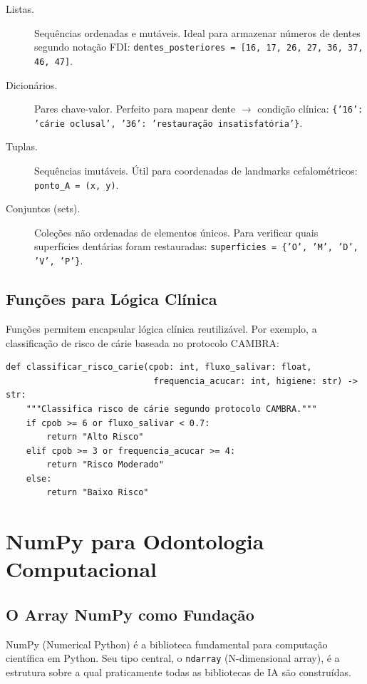 \begin{description}
    \item[Listas.] Sequências ordenadas e mutáveis. Ideal para armazenar números de dentes segundo notação FDI: \texttt{dentes\_posteriores = [16, 17, 26, 27, 36, 37, 46, 47]}.
    \item[Dicionários.] Pares chave-valor. Perfeito para mapear dente $\rightarrow$ condição clínica: \texttt{\{'16': 'cárie oclusal', '36': 'restauração insatisfatória'\}}.
    \item[Tuplas.] Sequências imutáveis. Útil para coordenadas de landmarks cefalométricos: \texttt{ponto\_A = (x, y)}.
    \item[Conjuntos (sets).] Coleções não ordenadas de elementos únicos. Para verificar quais superfícies dentárias foram restauradas: \texttt{superficies = \{'O', 'M', 'D', 'V', 'P'\}}.
\end{description}

\subsection{Funções para Lógica Clínica}

Funções permitem encapsular lógica clínica reutilizável. Por exemplo, a classificação de risco de cárie baseada no protocolo CAMBRA:

\begin{verbatim}
def classificar_risco_carie(cpob: int, fluxo_salivar: float,
                             frequencia_acucar: int, higiene: str) -> str:
    """Classifica risco de cárie segundo protocolo CAMBRA."""
    if cpob >= 6 or fluxo_salivar < 0.7:
        return "Alto Risco"
    elif cpob >= 3 or frequencia_acucar >= 4:
        return "Risco Moderado"
    else:
        return "Baixo Risco"
\end{verbatim}

\section{NumPy para Odontologia Computacional}

\subsection{O Array NumPy como Fundação}

NumPy  (Numerical Python) é a biblioteca fundamental para computação científica em Python. Seu tipo central, o \texttt{ndarray} (N-dimensional array), é a estrutura sobre a qual praticamente todas as bibliotecas de IA são construídas.

